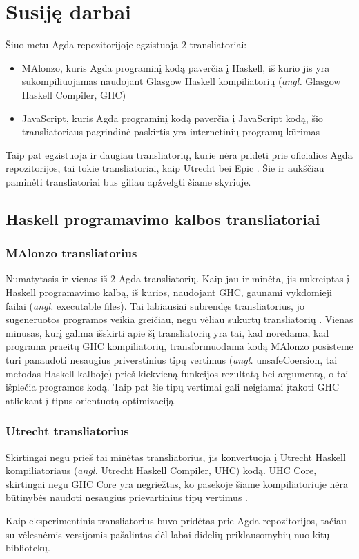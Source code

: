 \documentclass{VUMIFPSkursinis}
\begin{document}
\section{Susiję darbai}
Šiuo metu Agda repozitorijoje egzistuoja 2 transliatoriai: 
\begin{itemize}
	\item MAlonzo, kuris Agda programinį kodą paverčia į Haskell, iš kurio jis yra sukompiliuojamas naudojant Glasgow Haskell kompiliatorių (\textit{angl.} Glasgow Haskell Compiler, GHC)
	\item JavaScript, kuris Agda programinį kodą paverčia į JavaScript kodą, šio transliatoriaus pagrindinė paskirtis yra internetinių programų kūrimas \cite{html_agda}
\end{itemize}
Taip pat egzistuoja ir daugiau transliatorių, kurie nėra pridėti prie oficialios Agda repozitorijos, tai tokie transliatoriai, kaip Utrecht bei Epic \cite{Utrecht,Epic}. Šie ir aukščiau paminėti transliatoriai bus giliau apžvelgti šiame skyriuje.
\subsection{Haskell programavimo kalbos transliatoriai}
\subsubsection{MAlonzo transliatorius}
Numatytasis ir vienas iš 2 Agda transliatorių. Kaip jau ir minėta, jis nukreiptas į Haskell programavimo kalbą, iš kurios, naudojant GHC, gaunami vykdomieji failai (\textit{angl.} executable files). Tai labiausiai subrendęs transliatorius, jo sugeneruotos programos veikia greičiau, negu vėliau sukurtų transliatorių \cite{Utrecht,Epic}. Vienas minusas, kurį galima išskirti apie šį transliatorių yra tai, kad norėdama, kad programa praeitų GHC kompiliatorių, transformuodama kodą MAlonzo posistemė turi panaudoti nesaugius priverstinius tipų vertimus (\textit{angl.} unsafeCoersion, tai metodas Haskell kalboje) prieš kiekvieną funkcijos rezultatą bei argumentą, o tai išplečia programos kodą. Taip pat šie tipų vertimai gali neigiamai įtakoti GHC atliekant į tipus orientuotą optimizaciją.

\subsubsection{Utrecht transliatorius}
Skirtingai negu prieš tai minėtas transliatorius, jis konvertuoja į Utrecht Haskell kompiliatoriaus (\textit{angl.} Utrecht Haskell Compiler, UHC) kodą. UHC Core, skirtingai negu GHC Core yra negriežtas, ko pasekoje šiame kompiliatoriuje nėra būtinybės naudoti nesaugius prievartinius tipų vertimus \cite{Utrecht}.\par Kaip eksperimentinis transliatorius buvo pridėtas prie Agda repozitorijos, tačiau su vėlesnėmis versijomis pašalintas dėl labai didelių priklausomybių nuo kitų bibliotekų.
\end{document}
